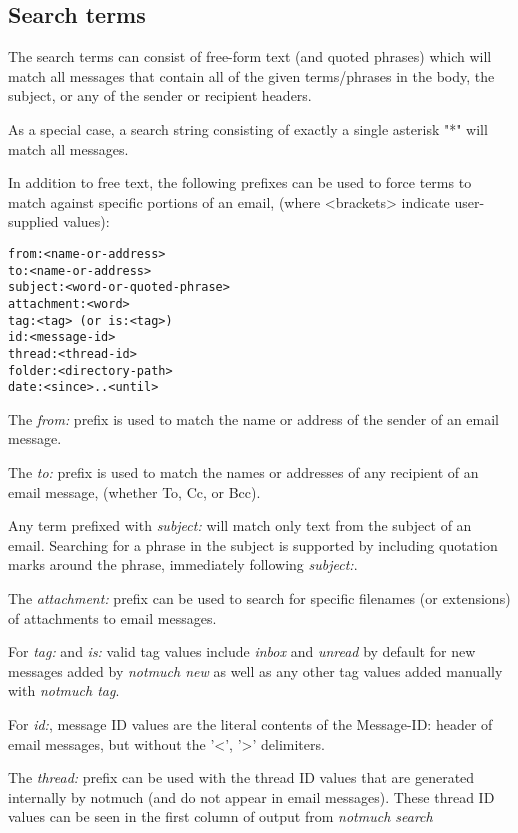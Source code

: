 \documentclass[a4,onecolumn,portrait]{article}
\begin{document}
\subsection{Search terms}
\label{sec-8-2}

The search terms can consist of free-form text (and quoted phrases) which will match all messages that contain all of the given terms/phrases in the body, the subject, or any of the sender or recipient headers.

As a special case, a search string consisting of exactly a single asterisk "*" will match all messages.

In addition to free text, the following prefixes can be used to force terms to match against specific portions of an email, (where <brackets> indicate user-supplied values):

\begin{verbatim}
from:<name-or-address>
to:<name-or-address>
subject:<word-or-quoted-phrase>
attachment:<word>
tag:<tag> (or is:<tag>)
id:<message-id>
thread:<thread-id>
folder:<directory-path>
date:<since>..<until>
\end{verbatim}

The \emph{from:} prefix is used to match the name or address of the sender of an email message.

The \emph{to:} prefix is used to match the names or addresses of any recipient of an email message, (whether To, Cc, or Bcc).

Any term prefixed with \emph{subject:} will match only text from the subject of an email. Searching for a phrase in the subject is supported by including quotation marks around the phrase, immediately following \emph{subject:}.

The \emph{attachment:} prefix can be used to search for specific filenames (or extensions) of attachments to email messages.

For \emph{tag:} and \emph{is:} valid tag values include \emph{inbox} and \emph{unread} by default for new messages added by \emph{notmuch new} as well as any other tag values added manually with \emph{notmuch tag}.

For \emph{id:}, message ID values are the literal contents of the Message-ID: header of email messages, but without the '<', '>' delimiters.

The \emph{thread:} prefix can be used with the thread ID values that are generated internally by notmuch (and do not appear in email messages).  These thread ID values can be seen in the first column of output from \emph{notmuch search}
\end{document}
